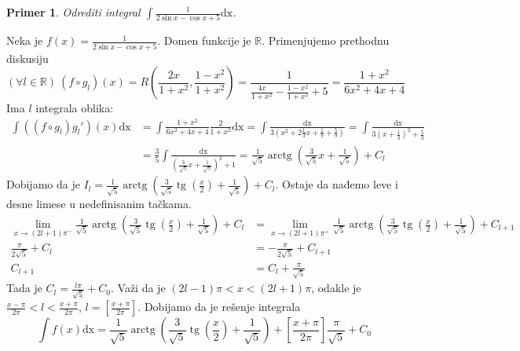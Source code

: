 \documentclass{article}
\newtheorem{prim}{Primer}[section]
\DeclareMathOperator{\tg}{tg}
\DeclareMathOperator{\arctg}{arctg}
\begin{document}
\begin{primbox}
    \label{primer_1.15}
    \begin{prim}
        Odrediti integral $\displaystyle\int\frac{1}{2\sin{x}-\cos{x}+5}\text{dx}$.
    \end{prim}
    Neka je $\displaystyle f\left(x\right)=\frac{1}{2\sin{x}-\cos{x}+5}$. Domen funkcije je $\mathbb{R}$. Primenjujemo prethodnu diskusiju
    $$\left(\forall l\in\mathbb{R}\right)\ \left(f\circ g_l\right)\left(x\right)=R\left(\frac{2x}{1+x^2},\frac{1-x^2}{1+x^2}\right)= \frac{1}{\frac{4x}{1+x^2}-\frac{1-x^2}{1+x^2}+5}=\frac{1+x^2}{6x^2+4x+4}$$
    Ima $l$ integrala oblika:
    \begin{align*}
        \int \left(\left(f\circ g_l\right)g_l'\right)\left(x\right)\text{dx} & =\int\frac{1+x^2}{6x^2+4x+4}\frac{2}{1+x^2}\text{dx}=\int \frac{\text{dx}}{3\left(x^2+2\frac{1}{3}x+\frac{1}{9}+\frac{5}{9}\right)}=\int\frac{\text{dx}}{3\left(x+\frac{1}{3}\right)^2+\frac{5}{3}} \\
                                                                             & =\frac{3}{5}\int\frac{\text{dx}}{\left(\frac{3}{\sqrt{5}}x+\frac{1}{\sqrt{5}}\right)^2+1}=\frac{1}{\sqrt{5}}\arctg\left(\frac{3}{\sqrt{5}}x+\frac{1}{\sqrt{5}}\right)+C_l
    \end{align*}
    Dobijamo da je $I_l =\frac{1}{\sqrt{5}}\arctg\left(\frac{3}{\sqrt{5}}\tg\left(\frac{x}{2}\right)+\frac{1}{\sqrt{5}}\right)+C_l$. Ostaje da nađemo leve i desne limese u nedefinisanim tačkama.
    \begin{align*}
        \lim\limits_{x\to \left(2l+1\right)\pi^{-}}\frac{1}{\sqrt{5}}\arctg\left(\frac{3}{\sqrt{5}}\tg\left(\frac{x}{2}\right)+\frac{1}{\sqrt{5}}\right)+C_l & =\lim\limits_{x\to \left(2l+1\right)\pi^{+}}\frac{1}{\sqrt{5}}\arctg\left(\frac{3}{\sqrt{5}}\tg\left(\frac{x}{2}\right)+\frac{1}{\sqrt{5}}\right)+C_{l+1} \\
        \frac{\pi}{2\sqrt{5}}+C_l                                                                                                                            & =-\frac{\pi}{2\sqrt{5}}+C_{l+1}                                                                                                                           \\
        C_{l+1}                                                                                                                                              & =C_l+\frac{\pi}{\sqrt{5}}
    \end{align*}
    Tada je $\displaystyle C_l=\frac{l\pi}{\sqrt{5}}+C_0$. Važi da je $\left(2l-1\right)\pi<x<\left(2l+1\right)\pi$, odakle je
    $\displaystyle\frac{x-\pi}{2\pi}<l<\frac{x+\pi}{2\pi}$, $\displaystyle l=\left[\frac{x+\pi}{2\pi}\right]$.
    Dobijamo da je rešenje integrala
    $$\int f\left(x\right)\text{dx}=\frac{1}{\sqrt{5}}\arctg\left(\frac{3}{\sqrt{5}}\tg\left(\frac{x}{2}\right)+\frac{1}{\sqrt{5}}\right)+\left[\frac{x+\pi}{2\pi}\right]\frac{\pi}{\sqrt{5}}+C_0$$
\end{primbox}
\end{document}
